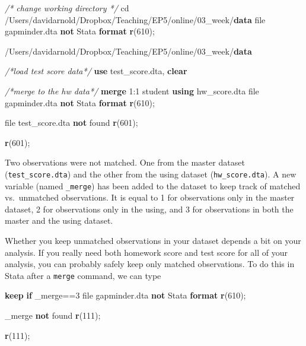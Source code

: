 \documentclass[
]{book}
\newenvironment{Shaded}{\begin{snugshade}}{\end{snugshade}}
\newcommand{\CommentTok}[1]{\textcolor[rgb]{0.56,0.35,0.01}{\textit{#1}}}
\newcommand{\DataTypeTok}[1]{\textcolor[rgb]{0.13,0.29,0.53}{#1}}
\newcommand{\FunctionTok}[1]{\textcolor[rgb]{0.13,0.29,0.53}{\textbf{#1}}}
\newcommand{\KeywordTok}[1]{\textcolor[rgb]{0.13,0.29,0.53}{\textbf{#1}}}
\newcommand{\NormalTok}[1]{#1}
\begin{document}
\begin{Shaded}
\begin{Highlighting}[]
\CommentTok{/* change working directory */}
\NormalTok{cd /Users/davidarnold/Dropbox/Teaching/EP5/online/03\_week/}\KeywordTok{data}
\NormalTok{file gapminder.dta }\KeywordTok{not}\NormalTok{ Stata }\KeywordTok{format}
\FunctionTok{r}\NormalTok{(610);}


\NormalTok{/Users/davidarnold/Dropbox/Teaching/EP5/online/03\_week/}\KeywordTok{data}
\end{Highlighting}
\end{Shaded}

\begin{Shaded}
\begin{Highlighting}[]
\CommentTok{/*load test score data*/}
\KeywordTok{use}\NormalTok{ test\_score.dta, }\KeywordTok{clear} 

\CommentTok{/*merge to the hw data*/}
\KeywordTok{merge}\NormalTok{ 1:1 student }\KeywordTok{using}\NormalTok{ hw\_score.dta}
\NormalTok{file gapminder.dta }\KeywordTok{not}\NormalTok{ Stata }\KeywordTok{format}
\FunctionTok{r}\NormalTok{(610);}


\NormalTok{file test\_score.dta }\KeywordTok{not}\NormalTok{ found}
\FunctionTok{r}\NormalTok{(601);}

\FunctionTok{r}\NormalTok{(601);}
\end{Highlighting}
\end{Shaded}

Two observations were not matched. One from the master dataset (\texttt{test\_score.dta}) and the other from the using dataset (\texttt{hw\_score.dta}). A new variable (named \texttt{\_merge}) has been added to the dataset to keep track of matched vs.~unmatched observations. It is equal to 1 for observations only in the master dataset, 2 for observations only in the using, and 3 for observations in both the master and the using dataset.

Whether you keep unmatched observations in your dataset depends a bit on your analysis. If you really need both homework score and test score for all of your analysis, you can probably safely keep only matched observations. To do this in Stata after a \texttt{merge} command, we can type

\begin{Shaded}
\begin{Highlighting}[]
\KeywordTok{keep} \KeywordTok{if} \DataTypeTok{\_merge}\NormalTok{==3}
\NormalTok{file gapminder.dta }\KeywordTok{not}\NormalTok{ Stata }\KeywordTok{format}
\FunctionTok{r}\NormalTok{(610);}


\DataTypeTok{\_merge} \KeywordTok{not}\NormalTok{ found}
\FunctionTok{r}\NormalTok{(111);}

\FunctionTok{r}\NormalTok{(111);}
\end{Highlighting}
\end{Shaded}
\end{document}
